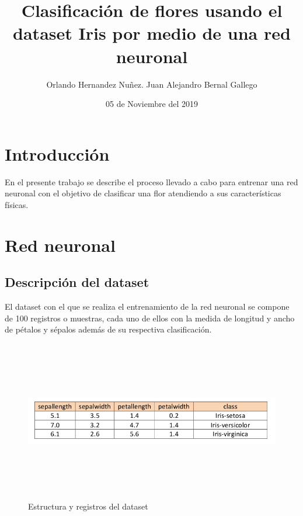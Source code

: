 \documentclass[11pt]{article}
\begin{document}
\title{ Clasificaci\'on de flores usando el dataset Iris por medio de una red neuronal }
\author{Orlando Hernandez Nu\~nez. Juan Alejandro Bernal Gallego}
\date{05 de Noviembre del 2019}
\maketitle
\section{Introducci\'on}
En el presente trabajo se describe el proceso llevado a cabo para entrenar una red neuronal con el objetivo de clasificar una flor atendiendo a sus caracter\'isticas f\'isicas.
\section{Red neuronal}
\subsection{Descripci\'on del dataset}
El dataset con el que se realiza el entrenamiento de la red neuronal se compone de 100 registros o muestras,
cada uno de ellos con la medida de longitud y ancho de p\'etalos y s\'epalos adem\'as de su respectiva clasificaci\'on.
\begin{figure}[h]
    \includegraphics[width=13cm, height=7cm]{dt_example}
    \centering
    \caption{Estructura y registros del dataset}
    \label{dt_example}
\end{figure}
\end{document}
